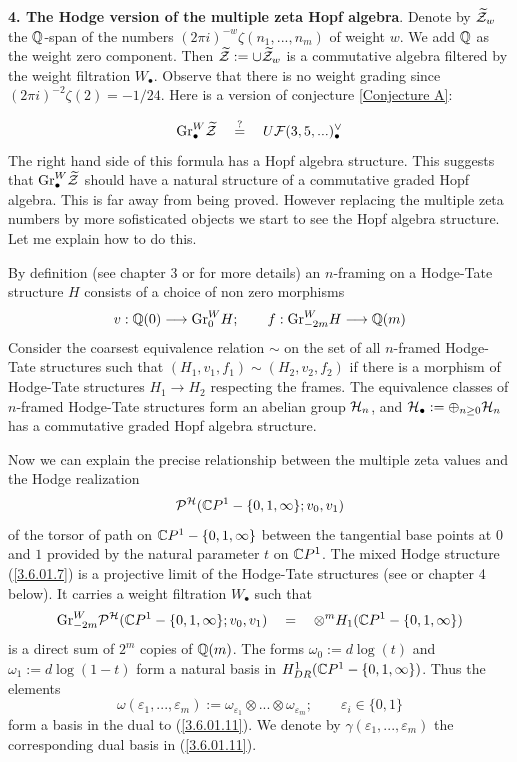 \documentclass[10pt]{article}
\begin{document}
 {\bf 4. The Hodge version of the multiple zeta Hopf algebra}. Denote by 
$\widetilde {\cal Z}_w$ the ${\mathbb Q}$-span of the numbers 
$(2\pi i)^{-w}\zeta(n_1, ..., n_m)$ of weight $w$. 
We add ${\mathbb Q}$ as the weight zero component.  Then 
$\widetilde {\cal Z}:= \cup \widetilde {\cal Z}_w$ is a commutative algebra filtered 
by the weight filtration $W_{\bullet}$. Observe that there is no weight grading since $(2\pi i)^{-2}\zeta(2) = - 1/24$. 
Here is a version of conjecture \ref{Conjecture A}:

$$
{\rm Gr}_{\bullet}^W\widetilde {\cal Z} \quad \stackrel{?}{=} \quad 
 U{\cal F}(3,5,...
)_{\bullet}^{\vee} 
$$
The right hand side of this formula has a Hopf algebra structure. 
This suggests that  ${\rm Gr}_{\bullet}^W\widetilde {\cal Z}$ should have 
a natural structure of a commutative graded Hopf algebra. This is 
far away from being proved. 
However replacing the multiple zeta numbers by more sofisticated objects 
we start to see the Hopf algebra structure. Let me explain how to do this. 

By definition (see chapter 3 or \cite{BGSV} for more details) an $n$-framing on a Hodge-Tate structure $H$ consists of a 
choice of non zero morphisms
$$
 v: {\mathbb Q}(0) \longrightarrow {\rm Gr}_{0}^WH; \qquad f: {\rm Gr}_{-2m}^WH \longrightarrow {\mathbb Q}(m)
$$
Consider the coarsest equivalence relation $\sim$ on the set of all 
$n$-framed Hodge-Tate structures such that $(H_1, v_1, f_1) \sim (H_2, v_2, f_2)$ if there 
is a morphism of Hodge-Tate structures $H_1 \to H_2$ respecting the frames. 
The equivalence classes 
of $n$-framed Hodge-Tate structures form an abelian group ${\cal H}_{n}$, and 
${\cal H}_{\bullet}:= \oplus_{n \geq 0}{\cal H}_{n}$ has a commutative 
graded Hopf algebra structure. 


Now we can explain the precise relationship between the multiple zeta values and 
the Hodge realization 
\begin{equation} \label{3.6.01.7}
{\cal P}^{\cal H}({\mathbb C} P^1 - \{0, 1, \infty\}; v_0, v_1)
\end{equation}
 of the torsor of path 
on ${\mathbb C} P^1-\{0, 1, \infty\}$ between the tangential base points 
at $0$ and $1$ provided by the  natural parameter $t$ on ${\mathbb C} P^1$. 
The mixed Hodge structure  (\ref{3.6.01.7}) is  a projective limit 
of the Hodge-Tate structures (see \cite{D} or chapter 4 below). 
It carries a weight filtration $W_{\bullet}$ such that 
\begin{equation} \label{3.6.01.11}
{\rm Gr}_{-2m}^W{\cal P}^{\cal H}({\mathbb C} P^1 - \{0, 1, \infty\}; v_0, v_1) \quad = \quad \otimes^m 
H_1({\mathbb C} P^1 - \{0, 1, \infty\})
\end{equation}
is a direct sum of $2^m$ copies of ${\mathbb Q}(m)$. 
The forms $\omega_0:= d\log (t)$ and $\omega_1:= d\log (1-t)$ form a natural basis in 
$H_{DR}^1({\mathbb C} P^1 - \{0, 1, \infty\})$. Thus the elements
$$
\omega(\varepsilon_1, ..., \varepsilon_m):= \omega_{\varepsilon_1} \otimes ... \otimes \omega_{\varepsilon_m}; \qquad \varepsilon_i 
\in \{0,1\}
$$
form a basis in the dual to (\ref{3.6.01.11}). We denote by 
$\gamma(\varepsilon_1, ...,\varepsilon_m)$ the corresponding dual basis in 
(\ref{3.6.01.11}). 
\end{document}
